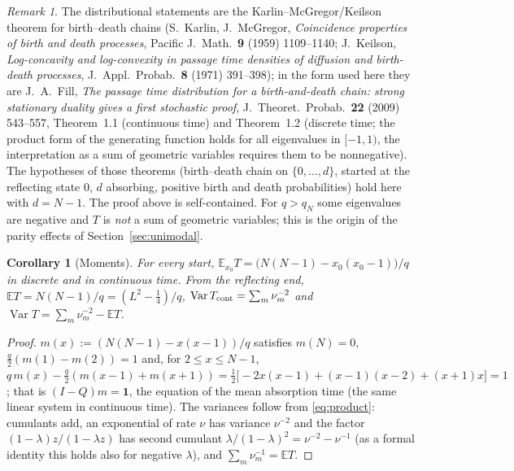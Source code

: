 \documentclass[11pt,a4paper]{article}
\newtheorem{corollary}[theorem]{Corollary}
\theoremstyle{definition}
\theoremstyle{remark}
\newtheorem{remark}[theorem]{Remark}
\newcommand{\E}{\mathbb{E}}
\begin{document}
\begin{remark}
The distributional statements are the Karlin--McGregor/Keilson theorem for birth--death chains
(S.~Karlin, J.~McGregor, \emph{Coincidence properties of birth and death processes}, Pacific J.\ Math.\
\textbf{9} (1959) 1109--1140; J.~Keilson, \emph{Log-concavity and log-convexity in passage time densities of
diffusion and birth-death processes}, J.\ Appl.\ Probab.\ \textbf{8} (1971) 391--398); in the form used here
they are J.~A.~Fill, \emph{The passage time distribution for a birth-and-death chain: strong stationary
duality gives a first stochastic proof}, J.\ Theoret.\ Probab.\ \textbf{22} (2009) 543--557, Theorem~1.1
(continuous time) and Theorem~1.2 (discrete time; the product form of the generating function holds for
all eigenvalues in $[-1,1)$, the interpretation as a sum of geometric variables requires them to be
nonnegative). The hypotheses of those theorems (birth--death chain on $\{0,\dots,d\}$, started at the
reflecting state $0$, $d$ absorbing, positive birth and death probabilities) hold here with $d=N-1$. The proof
above is self-contained. For $q>q_N$ some eigenvalues are negative and $T$ is \emph{not} a sum of geometric
variables; this is the origin of the parity effects of Section~\ref{sec:unimodal}.
\end{remark}

\begin{corollary}[Moments]\label{cor:moments}
For every start, $\E_{x_0}T=\bigl(N(N-1)-x_0(x_0-1)\bigr)/q$ in discrete and in continuous time. From the
reflecting end, $\E T=N(N-1)/q=(L^2-\frac14)/q$,
$\operatorname{Var}T_{\rm cont}=\sum_m\nu_m^{-2}$ and $\operatorname{Var}T=\sum_m\nu_m^{-2}-\E T$.
\end{corollary}
\begin{proof}
$m(x):=(N(N-1)-x(x-1))/q$ satisfies $m(N)=0$, $\frac q2(m(1)-m(2))=1$ and, for $2\le x\le N-1$,
$q\,m(x)-\frac q2(m(x-1)+m(x+1))=\frac12\bigl[-2x(x-1)+(x-1)(x-2)+(x+1)x\bigr]=1$; that is $(I-Q)m=\mathbf1$,
the equation of the mean absorption time (the same linear system in continuous time). The variances follow
from \eqref{eq:product}: cumulants add, an exponential of rate $\nu$ has variance $\nu^{-2}$ and the factor
$(1-\lambda)z/(1-\lambda z)$ has second cumulant $\lambda/(1-\lambda)^2=\nu^{-2}-\nu^{-1}$ (as a formal identity
this holds also for negative $\lambda$), and $\sum_m\nu_m^{-1}=\E T$.
\end{proof}
\end{document}
